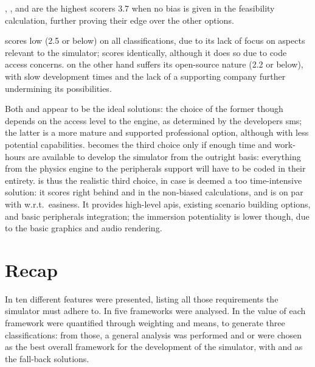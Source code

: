 , , and  are the highest scorers \num{3,7} when no bias is given in the \gls{feasibility} calculation, further proving their edge over the other options.

 scores low (\num{2,5} or below) on all classifications, due to its lack of focus on aspects relevant to the simulator;  scores identically, although it does so due to code access concerns.  on the other hand suffers its open-source nature (\num{2,2} or below), with slow development times and the lack of a supporting company further undermining its possibilities.

Both  and  appear to be the ideal solutions: the choice of the former though depends on the access level to the engine, as determined by the developers \gls{sms}; the latter is a more mature and supported professional option, although with less potential capabilities.  becomes the third choice only if enough time and work-hours are available to develop the simulator from the outright basis: everything from the physics engine to the peripherals support will have to be coded in their entirety.  is thus the realistic third choice, in case  is deemed a too time-intensive solution: it scores right behind  and  in the non-biased calculations, and is on par with  w.r.t.\ \gls{easiness}. It provides high-level \glspl{api}, existing scenario building options, and basic peripherals integration; the immersion potentiality is lower though, due to the basic graphics and audio rendering. %

\section{Recap}\label{sc:stateoftheart:recap}

In  ten different \glspl{feature} were presented, listing all those requirements the simulator must adhere to. In  five \glspl{framework} were analysed. In  the value of each \gls{framework} were quantified through weighting and means, to generate three classifications: from those, a general analysis was performed and  or  were chosen as the best overall \gls{framework} for the development of the simulator, with  and  as the fall-back solutions.
